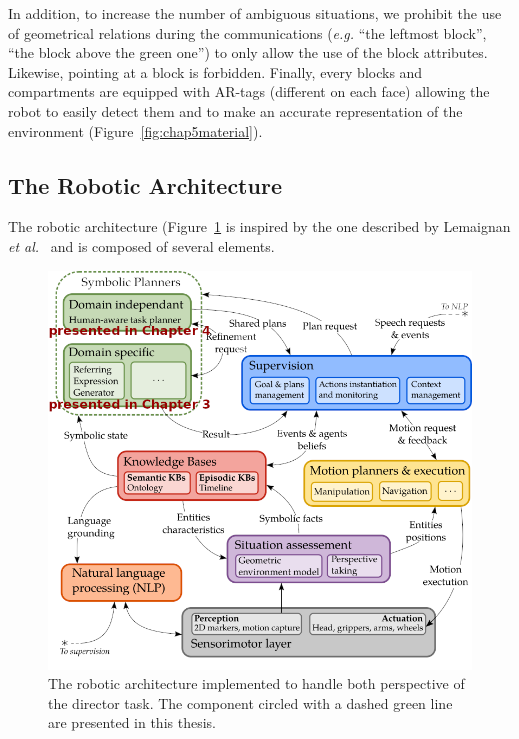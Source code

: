 \documentclass[a4paper,11pt,twoside]{StyleThese}
\begin{document}
In addition, to increase the number of ambiguous situations, we prohibit the use of geometrical relations during the communications (\textit{e.g.} ``the leftmost block'', ``the block above the green one'') to only allow the use of the block attributes. Likewise, pointing at a block is forbidden.
Finally, every blocks and compartments are equipped with AR-tags (different on each face) allowing the robot to easily detect them and to make an accurate representation of the environment (Figure~\ref{fig:chap5material}).

\subsection{The Robotic Architecture}
The robotic architecture (Figure~\ref{fig:chap5dtarchi} is inspired by the one described by Lemaignan \textit{et al.}~\cite{lemaignan2017artificial} and is composed of several elements.

\begin{figure}[hbtp]
\centering
\includegraphics[width=\textwidth]{figures/chapter5/architecture.png}
\caption{The robotic architecture implemented to handle both perspective of the director task. The component circled with a dashed green line are presented in this thesis.}
\label{fig:chap5dtarchi}
\end{figure}
\end{document}
